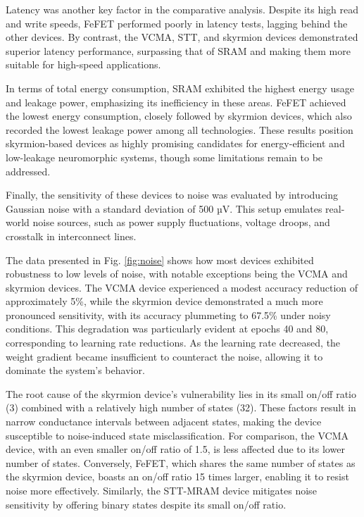 \documentclass[conference]{IEEEtran}
\begin{document}
Latency was another key factor in the comparative analysis. Despite its high read and write speeds, FeFET performed poorly in latency tests, lagging behind the other devices. By contrast, the VCMA, STT, and skyrmion devices demonstrated superior latency performance, surpassing that of SRAM and making them more suitable for high-speed applications.

In terms of total energy consumption, SRAM exhibited the highest energy usage and leakage power, emphasizing its inefficiency in these areas. FeFET achieved the lowest energy consumption, closely followed by skyrmion devices, which also recorded the lowest leakage power among all technologies. These results position skyrmion-based devices as highly promising candidates for energy-efficient and low-leakage neuromorphic systems, though some limitations remain to be addressed.

Finally, the sensitivity of these devices to noise was evaluated by introducing Gaussian noise with a standard deviation of 500 µV. This setup emulates real-world noise sources, such as power supply fluctuations, voltage droops, and crosstalk in interconnect lines.

The data presented in Fig. \ref{fig:noise} shows how most devices exhibited robustness to low levels of noise, with notable exceptions being the VCMA and skyrmion devices. The VCMA device experienced a modest accuracy reduction of approximately 5\%, while the skyrmion device demonstrated a much more pronounced sensitivity, with its accuracy plummeting to 67.5\% under noisy conditions. This degradation was particularly evident at epochs 40 and 80, corresponding to learning rate reductions. As the learning rate decreased, the weight gradient became insufficient to counteract the noise, allowing it to dominate the system's behavior.

The root cause of the skyrmion device's vulnerability lies in its small on/off ratio (3) combined with a relatively high number of states (32). These factors result in narrow conductance intervals between adjacent states, making the device susceptible to noise-induced state misclassification. For comparison, the VCMA device, with an even smaller on/off ratio of 1.5, is less affected due to its lower number of states. Conversely, FeFET, which shares the same number of states as the skyrmion device, boasts an on/off ratio 15 times larger, enabling it to resist noise more effectively. Similarly, the STT-MRAM device mitigates noise sensitivity by offering binary states despite its small on/off ratio.
\end{document}
